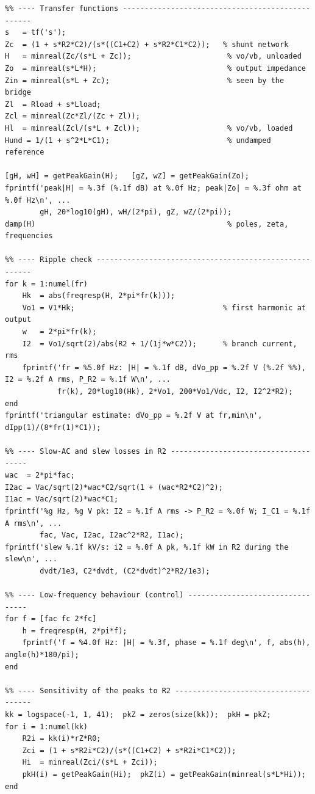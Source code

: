 \documentclass[11pt,a4paper]{article}
\begin{document}
\begin{lstlisting}
%% ---- Transfer functions -------------------------------------------------
s   = tf('s');
Zc  = (1 + s*R2*C2)/(s*((C1+C2) + s*R2*C1*C2));   % shunt network
H   = minreal(Zc/(s*L + Zc));                      % vo/vb, unloaded
Zo  = minreal(s*L*H);                              % output impedance
Zin = minreal(s*L + Zc);                           % seen by the bridge
Zl  = Rload + s*Lload;
Zcl = minreal(Zc*Zl/(Zc + Zl));
Hl  = minreal(Zcl/(s*L + Zcl));                    % vo/vb, loaded
Hund = 1/(1 + s^2*L*C1);                           % undamped reference

[gH, wH] = getPeakGain(H);   [gZ, wZ] = getPeakGain(Zo);
fprintf('peak|H| = %.3f (%.1f dB) at %.0f Hz; peak|Zo| = %.3f ohm at %.0f Hz\n', ...
        gH, 20*log10(gH), wH/(2*pi), gZ, wZ/(2*pi));
damp(H)                                            % poles, zeta, frequencies

%% ---- Ripple check -------------------------------------------------------
for k = 1:numel(fr)
    Hk  = abs(freqresp(H, 2*pi*fr(k)));
    Vo1 = V1*Hk;                                  % first harmonic at output
    w   = 2*pi*fr(k);
    I2  = Vo1/sqrt(2)/abs(R2 + 1/(1j*w*C2));      % branch current, rms
    fprintf('fr = %5.0f Hz: |H| = %.1f dB, dVo_pp = %.2f V (%.2f %%), I2 = %.2f A rms, P_R2 = %.1f W\n', ...
            fr(k), 20*log10(Hk), 2*Vo1, 200*Vo1/Vdc, I2, I2^2*R2);
end
fprintf('triangular estimate: dVo_pp = %.2f V at fr,min\n', dIpp(1)/(8*fr(1)*C1));

%% ---- Slow-AC and slew losses in R2 -------------------------------------
wac  = 2*pi*fac;
I2ac = Vac/sqrt(2)*wac*C2/sqrt(1 + (wac*R2*C2)^2);
I1ac = Vac/sqrt(2)*wac*C1;
fprintf('%g Hz, %g V pk: I2 = %.1f A rms -> P_R2 = %.0f W; I_C1 = %.1f A rms\n', ...
        fac, Vac, I2ac, I2ac^2*R2, I1ac);
fprintf('slew %.1f kV/s: i2 = %.0f A pk, %.1f kW in R2 during the slew\n', ...
        dvdt/1e3, C2*dvdt, (C2*dvdt)^2*R2/1e3);

%% ---- Low-frequency behaviour (control) ---------------------------------
for f = [fac fc 2*fc]
    h = freqresp(H, 2*pi*f);
    fprintf('f = %4.0f Hz: |H| = %.3f, phase = %.1f deg\n', f, abs(h), angle(h)*180/pi);
end

%% ---- Sensitivity of the peaks to R2 -------------------------------------
kk = logspace(-1, 1, 41);  pkZ = zeros(size(kk));  pkH = pkZ;
for i = 1:numel(kk)
    R2i = kk(i)*rZ*R0;
    Zci = (1 + s*R2i*C2)/(s*((C1+C2) + s*R2i*C1*C2));
    Hi  = minreal(Zci/(s*L + Zci));
    pkH(i) = getPeakGain(Hi);  pkZ(i) = getPeakGain(minreal(s*L*Hi));
end


\end{lstlisting}
\end{document}
